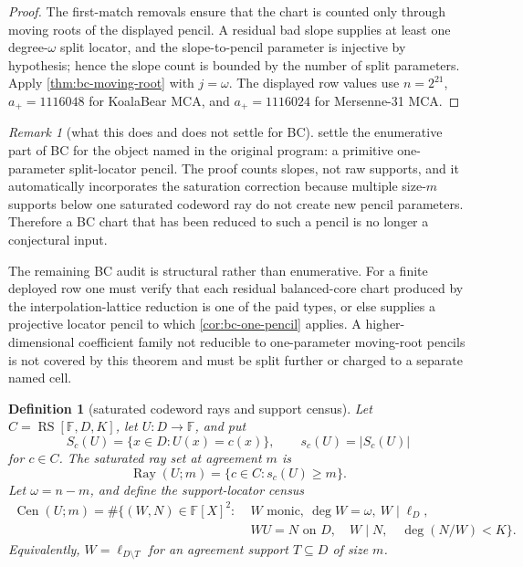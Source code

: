 \documentclass[a4paper,11pt]{amsart}
\newtheorem{definition}[definition]{Definition}
\theoremstyle{remark}
\newtheorem{remark}[remark]{Remark}
\newcommand{\F}{\mathbb F}
\newcommand{\RS}{\operatorname{RS}}
\newcommand{\Cen}{\operatorname{Cen}}
\begin{document}
\begin{proof}
The first-match removals ensure that the chart is counted only through moving roots of the displayed pencil.  A residual bad slope supplies at least one degree-\(\omega\) split locator, and the slope-to-pencil parameter is injective by hypothesis; hence the slope count is bounded by the number of split parameters.  Apply \cref{thm:bc-moving-root} with \(j=\omega\).  The displayed row values use \(n=2^{21}\), \(a_+=1116048\) for KoalaBear MCA, and \(a_+=1116024\) for Mersenne-31 MCA.
\end{proof}

\begin{remark}[what this does and does not settle for BC]\label{rem:bc-status-after-moving-root}
 settle the enumerative part of BC for the object named in the original program: a primitive one-parameter split-locator pencil.  The proof counts slopes, not raw supports, and it automatically incorporates the saturation correction because multiple size-\(m\) supports below one saturated codeword ray do not create new pencil parameters.  Therefore a BC chart that has been reduced to such a pencil is no longer a conjectural input.

The remaining BC audit is structural rather than enumerative.  For a finite deployed row one must verify that each residual balanced-core chart produced by the interpolation-lattice reduction is one of the paid types, or else supplies a projective locator pencil to which \cref{cor:bc-one-pencil} applies.  A higher-dimensional coefficient family not reducible to one-parameter moving-root pencils is not covered by this theorem and must be split further or charged to a separate named cell.
\end{remark}


\begin{definition}[saturated codeword rays and support census]\label{def:saturated-rays}
Let \(C=\RS[\F,D,K]\), let \(U:D\to\F\), and put
\[
        S_c(U)=\{x\in D:U(x)=c(x)\},\qquad s_c(U)=|S_c(U)|
\]
for \(c\in C\).  The saturated ray set at agreement \(m\) is
\[
        \operatorname{Ray}(U;m)=\{c\in C:s_c(U)\ge m\}.
\]
Let \(\omega=n-m\), and define the support-locator census
\[
\begin{aligned}
\Cen(U;m)=\#\{(W,N)\in \F[X]^2:\;& W\text{ monic},\ \deg W=\omega,\ W\mid \ell_D,\\
        & WU=N\text{ on }D,\quad W\mid N,\quad \deg(N/W)<K\}.
\end{aligned}
\]
Equivalently, \(W=\ell_{D\setminus T}\) for an agreement support \(T\subseteq D\) of size \(m\).
\end{definition}
\end{document}
